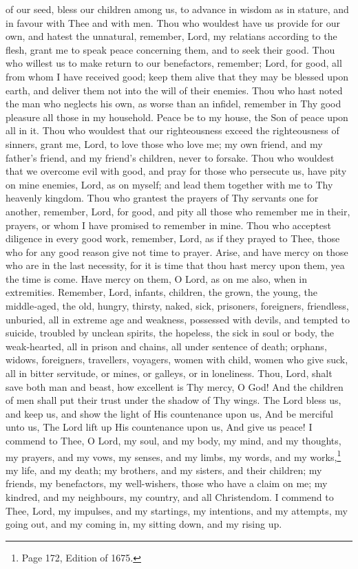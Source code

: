 of our seed, bless our children among us, to advance in wisdom as in stature, and in favour with Thee and with men. Thou who wouldest have us provide for our own, and hatest the unnatural, remember, Lord, my relatians according to the flesh, grant me to speak peace concerning them, and to seek their good. Thou who willest us to make return to our benefactors, remember; Lord, for good, all from whom I have received good; keep them alive that they may be blessed upon earth, and deliver them not into the will of their enemies. Thou who hast noted the man who neglects his own, as worse than an infidel, remember in Thy good pleasure all those in my household. Peace be to my house, the Son of peace upon all in it. Thou who wouldest that our righteousness exceed the righteousness of sinners, grant me, Lord, to love those who love me; my own friend, and my father’s friend, and my friend’s children, never to forsake. Thou who wouldest that we overcome evil with good, and pray for those who persecute us, have pity on mine enemies, Lord, as on myself; and lead them together with me to Thy heavenly kingdom. Thou who grantest the prayers of Thy servants one for another, remember, Lord, for good, and pity all those who remember me in their, prayers, or whom I have promised to remember in mine. Thou who acceptest diligence in every good work, remember, Lord, as if they prayed to Thee, those who for any good reason give not time to prayer. Arise, and have mercy on those who are in the last necessity, for it is time that thou hast mercy upon them, yea the time is come. Have mercy on them, O Lord, as on me also, when in extremities. Remember, Lord, infants, children, the grown, the young, the middle‑aged, the old, hungry, thirsty, naked, sick, prisoners, foreigners, friendless, unburied, all in extreme age and weakness, possessed with devils, and tempted to suicide, troubled by unclean spirits, the hopeless, the sick in soul or body, the weak‑hearted, all in prison and chains, all under sentence of death; orphans, widows, foreigners, travellers, voyagers, women with child, women who give suck, all in bitter servitude, or mines, or galleys, or in loneliness. Thou, Lord, shalt save both man and beast, how excellent is Thy mercy,  O God! And the children of men shall put their trust under the shadow of Thy wings. The Lord bless us, and keep us, and show the light of His countenance upon us, And be merciful unto us, The Lord lift up His countenance upon us, And give us peace! I commend to Thee, O Lord, my soul, and my body, my mind, and my thoughts, my prayers, and my vows, my senses, and my limbs, my words, and my works,\footnote{Page 172, Edition of 1675.} my life, and my death; my brothers, and my sisters, and their children; my friends, my benefactors, my well-wishers, those who have a claim on me; my kindred, and my neighbours, my country, and all Christendom. I commend to Thee, Lord, my impulses, and my startings, my intentions, and my attempts, my going out, and my coming in, my sitting down, and my rising up.

